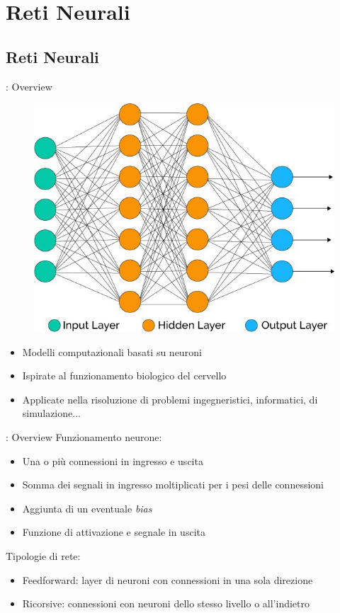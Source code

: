 \documentclass[xcolor=x11names,compress, 
]{beamer}
\theoremstyle{definition} \newtheorem{esempio}{Esempio}
\theoremstyle{definition}
\begin{document}
	
\section{Reti Neurali}	
	\subsection{Reti Neurali}
		\begin{frame}{\subsecname: Overview}
			\begin{figure}
				\includegraphics[scale=0.3]{immagini/linear}
			\end{figure}
			\begin{itemize}
				\item Modelli computazionali basati su neuroni
				\item Ispirate al funzionamento biologico del cervello
				\item Applicate nella risoluzione di problemi ingegneristici, informatici, di simulazione...
			\end{itemize}
		\end{frame}
		
		\begin{frame}{\subsecname: Overview}
			Funzionamento neurone:
			\begin{itemize}
				\item Una o più connessioni in ingresso e uscita
				\item Somma dei segnali in ingresso moltiplicati per i pesi delle connessioni
				\item Aggiunta di un eventuale \textit{bias}
				\item Funzione di attivazione e segnale in uscita
			\end{itemize}
			
			Tipologie di rete:
			\begin{itemize}
				\item Feedforward: layer di neuroni con connessioni in una sola direzione
				\item Ricorsive: connessioni con neuroni dello stesso livello o all'indietro
			\end{itemize}
		\end{frame}
		
\end{document}

